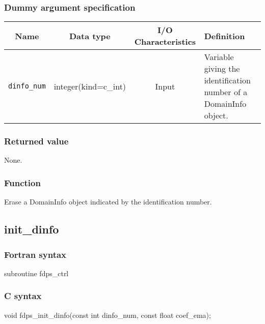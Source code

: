 \subsubsection*{Dummy argument specification}
\begin{table}[h]
\begin{tabularx}{\linewidth}{cccX}
\toprule
\rowcolor{Snow2}
Name & Data type & I/O Characteristics & Definition \\
\midrule
\texttt{dinfo\_num} & integer(kind=c\_int) & Input & Variable giving the identification number of a DomainInfo object. \\
\bottomrule
\end{tabularx}
\end{table}


\subsubsection*{Returned value}
None.

\subsubsection*{Function}
Erase a DomainInfo object indicated by the identification number.

\clearpage

\subsection{init\_dinfo}
\subsubsection*{Fortran syntax}
\begin{screen}
\begin{spverbatim}
subroutine fdps_ctrl%
\end{spverbatim}
\end{screen}

\subsubsection*{C syntax}
\begin{screen}
\begin{spverbatim}
void fdps_init_dinfo(const int dinfo_num,
                     const float coef_ema);
\end{spverbatim}
\end{screen}

